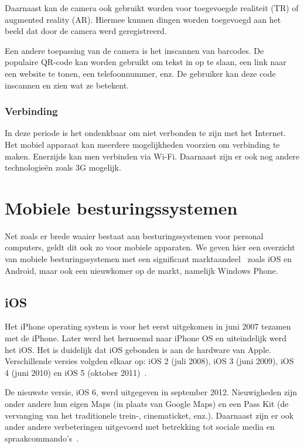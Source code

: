 Daarnaast kan de camera ook gebruikt worden voor toegevoegde realiteit (TR) of  augmented reality (AR). Hiermee kunnen dingen worden toegevoegd aan het beeld dat door de camera werd geregistreerd.

Een andere toepassing van de camera is het inscannen van barcodes. De populaire QR-code kan worden gebruikt om tekst in op te slaan, een link naar een website te tonen, een telefoonnummer, enz. De gebruiker kan deze code inscannen en zien wat ze betekent.

\subsubsection{Verbinding}
In deze periode is het ondenkbaar om niet verbonden te zijn met het Internet. Het mobiel apparaat kan meerdere mogelijkheden voorzien om verbinding te maken. Enerzijds kan men verbinden via Wi-Fi. Daarnaast zijn er ook nog andere technologieën zoals 3G mogelijk.


\section{Mobiele besturingssystemen}
\label{sec:mobiele-besturingssystemen}
Net zoals er brede waaier bestaat aan besturingssystemen voor personal computers, geldt dit ook zo voor mobiele apparaten. We geven hier een overzicht van mobiele besturingssystemen met een significant marktaandeel~\cite{David2011, Hales2012} zoals iOS en Android, maar ook een nieuwkomer op de markt, namelijk Windows Phone.

\subsection{iOS}
Het iPhone operating system is voor het eerst uitgekomen in juni 2007 tezamen met de iPhone. Later werd het hernoemd naar iPhone OS en uiteindelijk werd het iOS. Het is duidelijk dat iOS gebonden is aan de hardware van Apple. Verschillende versies volgden elkaar op: iOS 2 (juli 2008), iOS 3 (juni 2009), iOS 4 (juni 2010) en iOS 5 (oktober 2011)~\cite{Deitel2012, PhilDutson2012}. 

De nieuwste versie, iOS 6, werd uitgegeven in september 2012. Nieuwigheden zijn onder andere hun eigen Maps (in plaats van Google Maps) en een Pass Kit (de vervanging van het traditionele trein-, cinematicket, enz.). Daarnaast zijn er ook ander andere verbeteringen uitgevoerd met betrekking tot sociale media en spraakcommando's~\cite{Deitel2012}.


